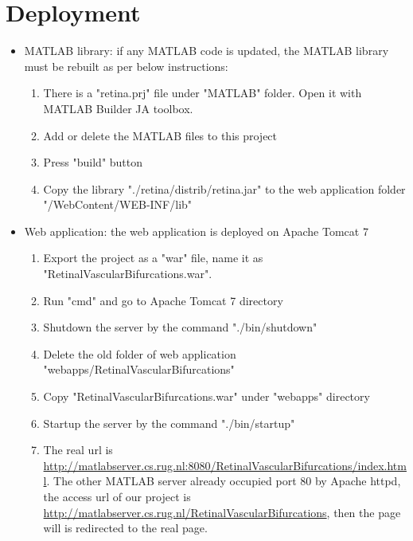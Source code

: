 \documentclass[a4paper]{article}
\begin{document}
\section{Deployment}
\begin{itemize}
\item MATLAB library: if any MATLAB code is updated, the MATLAB library must be rebuilt as per below instructions:
	\begin{enumerate}
	\item There is a "retina.prj" file under "MATLAB" folder. Open it with MATLAB Builder JA toolbox.
	\item Add or delete the MATLAB files to this project
	\item Press "build" button
	\item Copy the library "./retina/distrib/retina.jar" to the web application folder "/WebContent/WEB-INF/lib"
	\end{enumerate}
\item Web application: the web application is deployed on Apache Tomcat 7
	\begin{enumerate}
	\item Export the project as a "war" file, name it as "RetinalVascularBifurcations.war".
	\item Run "cmd" and go to Apache Tomcat 7 directory
	\item Shutdown the server by the command "./bin/shutdown"
	\item Delete the old folder of web application "webapps/RetinalVascularBifurcations"
	\item Copy "RetinalVascularBifurcations.war" under "webapps" directory
	\item Startup the server by the command "./bin/startup"
	\item The real url is \url{http://matlabserver.cs.rug.nl:8080/RetinalVascularBifurcations/index.html}. The other MATLAB server already occupied port 80 by Apache httpd, the access url of our project is \url{http://matlabserver.cs.rug.nl/RetinalVascularBifurcations}, then the page will is redirected to the real page.
	\end{enumerate}
\end{itemize}
\end{document}
